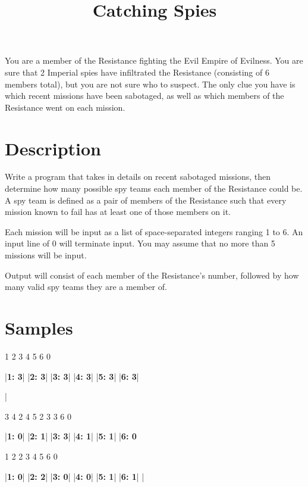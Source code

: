 \documentclass{../codeproblem}
\begin{document}
\title{Catching Spies}

\begin{flavor}
  You are a member of the Resistance fighting the Evil Empire of Evilness. You are sure that 2 Imperial spies have infiltrated the Resistance (consisting of 6 members total), but you are not sure who to suspect. The only clue you have is which recent missions have been sabotaged, as well as which members of the Resistance went on each mission.
\end{flavor}

\section*{Description}
Write a program that takes in details on recent sabotaged missions, then determine how many possible spy teams each member of the Resistance could be. A spy team is defined as a pair of members of the Resistance such that every mission known to fail has at least one of those members on it.

Each mission will be input as a list of space-separated integers ranging 1 to 6. An input line of 0 will terminate input. You may assume that no more than 5 missions will be input.

Output will consist of each member of the Resistance's number, followed by how many valid spy teams they are a member of.

\section*{Samples}
\begin{minipage}[t]{.33\linewidth}
\begin{example}
1 2 3
4 5 6
0

|\textbf{1: 3}|
|\textbf{2: 3}|
|\textbf{3: 3}|
|\textbf{4: 3}|
|\textbf{5: 3}|
|\textbf{6: 3}|

|\end{example}
\end{minipage}
\begin{minipage}[t]{.33\linewidth}
\begin{example}
3 4
2 4 5
2 3
3 6
0

|\textbf{1: 0}|
|\textbf{2: 1}|
|\textbf{3: 3}|
|\textbf{4: 1}|
|\textbf{5: 1}|
|\textbf{6: 0}\end{example}
\end{minipage}
\begin{minipage}[t]{.33\linewidth}
\begin{example}
1 2
2 3 4
5 6
0

|\textbf{1: 0}|
|\textbf{2: 2}|
|\textbf{3: 0}|
|\textbf{4: 0}|
|\textbf{5: 1}|
|\textbf{6: 1}|
|\end{example}
\end{minipage}
\end{document}
